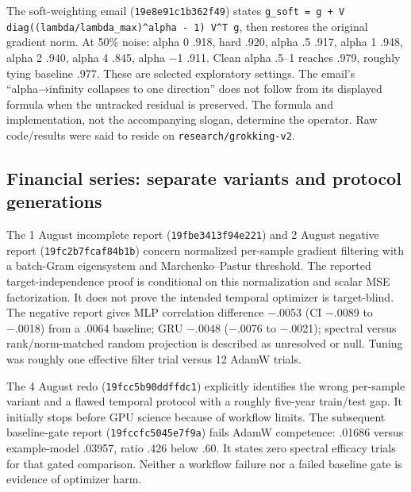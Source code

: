 \documentclass[
  british,
  10pt,
  a4paper,
]{article}
\begin{document}
The soft-\allowbreak{}weighting email
(\texttt{19e8e91c1b36\allowbreak{}2f49}) states
\texttt{g\_\allowbreak{}soft \allowbreak{}=\allowbreak{} \allowbreak{}g \allowbreak{}+ \allowbreak{}V \allowbreak{}diag((lambda\allowbreak{}/\allowbreak{}lambda\_\allowbreak{}max)\textasciicircum{}alpha \allowbreak{}-\allowbreak{} \allowbreak{}1) \allowbreak{}V\textasciicircum{}T \allowbreak{}g},
then restores the original gradient norm. At 50\% noise: alpha 0 .918,
hard .920, alpha .5 .917, alpha 1 .948, alpha 2 .940, alpha 4 .845,
alpha −1 .911. Clean alpha .5--1 reaches .979, roughly tying baseline
.977. These are selected exploratory settings. The email's
``alpha→infinity collapses to one direction'' does not follow from its
displayed formula when the untracked residual is preserved. The formula
and implementati\allowbreak{}on,\allowbreak{} not the accompanying
slogan, determine the operator. Raw code/\allowbreak{}results were said
to reside on \texttt{research/\allowbreak{}grokking-\allowbreak{}v2}.

\subsection{Financial series: separate variants and protocol
generations}\label{email-evidence--financial-series-separate-variants-and-protocol-generations}

The 1 August incomplete report (\texttt{19fbe3413f94\allowbreak{}e221})
and 2 August negative report (\texttt{19fc2b7fcaf8\allowbreak{}4b1b})
concern normalized per-sample gradient filtering with a batch-Gram
eigensystem and Marchenko--Pastur threshold. The reported
target-\allowbreak{}independence\allowbreak{} proof is conditional on
this normalization and scalar MSE
factorizatio\allowbreak{}n.\allowbreak{} It does not prove the intended
temporal optimizer is target-\allowbreak{}blind.\allowbreak{} The
negative report gives MLP correlation difference −.0053 (CI −.0089 to
−.0018) from a .0064 baseline; GRU −.0048 (−.0076 to −.0021); spectral
versus rank/\allowbreak{}norm-\allowbreak{}matched random projection is
described as unresolved or null. Tuning was roughly one effective filter
trial versus 12 AdamW trials.

The 4 August redo (\texttt{19fcc5b90ddf\allowbreak{}fdc1}) explicitly
identifies the wrong per-sample variant and a flawed temporal protocol
with a roughly five-year train/test gap. It initially stops before GPU
science because of workflow limits. The subsequent
baseline-\allowbreak{}gate report
(\texttt{19fccfc5045e\allowbreak{}7f9a}) fails AdamW competence: .01686
versus example-\allowbreak{}model .03957, ratio .426 below .60. It
states zero spectral efficacy trials for that gated
comparison.\allowbreak{} Neither a workflow failure nor a failed
baseline gate is evidence of optimizer harm.
\end{document}
